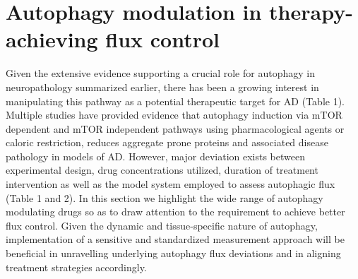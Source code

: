\section{Autophagy modulation in therapy-achieving flux control}


Given the extensive evidence supporting a crucial role for autophagy in neuropathology summarized earlier, there has been a growing interest in manipulating this pathway as a potential therapeutic target for AD (Table 1). Multiple studies have provided evidence that autophagy induction via mTOR dependent and mTOR independent pathways using pharmacological agents or caloric restriction, reduces aggregate prone proteins and associated disease pathology in models of AD. However, major deviation exists between experimental design, drug concentrations utilized, duration of treatment intervention as well as the model system employed to assess autophagic flux (Table 1 and 2). In this section we highlight the wide range of autophagy modulating drugs so as to draw attention to the requirement to achieve better flux control. Given the dynamic and tissue-specific nature of autophagy, implementation of a sensitive and standardized measurement approach will be beneficial in unravelling underlying autophagy flux deviations and in aligning treatment strategies accordingly. 

